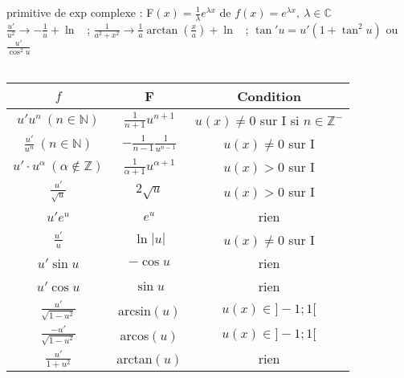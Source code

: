 \documentclass[12 pt]{exampleclass}
\begin{document}
\begin{flushleft}
\begin{doublespace}

	primitive de exp complexe : F$(x)=\frac{1}{\lambda}e^{\lambda x}$ de $f(x) = e^{\lambda x}, \ \lambda \in \mathbb{C}$\\
	$\frac{u'}{u^2} \rightarrow - \frac{1}{u} +\ln$ \ ; $\frac{1}{a^2+x^2} \rightarrow \frac{1}{a} \arctan(\frac{x}{a}) + \ln $ \ ; $ \tan' u = u'(1+\tan^2 u)$ ou $ \frac{u'}{\cos^2 u}$\\
	\text{}\\
	\begin{tabular}{|c|c|c|}
	\hline
	$f$ & F & Condition  \\
	\hline
	$u' u^n \ (n\in \mathbb{N})$ & $\frac{1}{n+1} u^{n+1}$ & $u(x) \ne 0$ sur I si $n\in \mathbb{Z}^-$  \\
	\hline
	 $\frac{u'}{u^n} \ (n\in\mathbb{N})$ & $-\frac{1}{n-1} \frac{1}{u^{n-1}}$ & $u(x)\ne 0$ sur I\\
	\hline
	 $u' \cdot u^\alpha \ (\alpha \notin \mathbb{Z})$ & $\frac{1}{\alpha + 1} u^{\alpha +1}$ & $u(x)>0$ sur I\\
	\hline
	$\frac{u'}{\sqrt{u}}$ & $ 2 \sqrt{u} $ & $ u(x)>0$ sur I  \\
	\hline
	 $u' e^u$&$e^u$& rien\\
	\hline
	 $\frac{u'}{u}$&$\ln |u|$&$u(x)\ne 0$ sur I\\
	\hline
	 $u'\sin u $ & $ - \cos u$ & rien\\
	\hline
	 $u'\cos u$&$\sin u$& rien\\
	\hline
	$\frac{u'}{\sqrt{1-u^2}}$&arcsin$(u)$&$u(x) \in ]-1;1[$\\
	\hline
	$\frac{-u'}{\sqrt{1-u^2}}$& arcos$(u)$&$u(x) \in ]-1;1[$\\
	\hline
	$\frac{u'}{1+u^2}$& arctan$(u)$& rien\\
	\hline
	\end{tabular}
	

\end{doublespace}
\end{flushleft}
\end{document}

